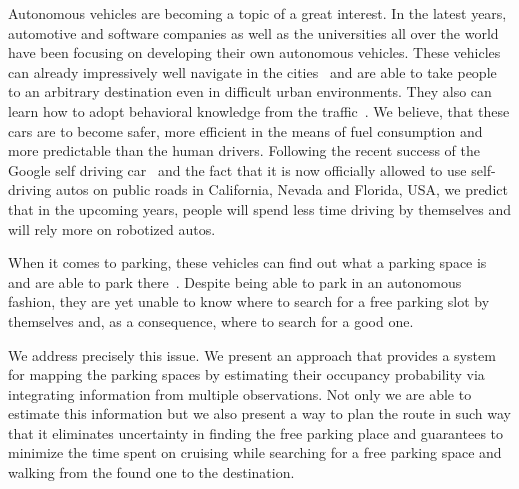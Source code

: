 Autonomous vehicles are becoming a topic of a great interest. In the latest
years, automotive and software companies as well as the universities all over
the world have been focusing on developing their own autonomous vehicles.
These vehicles can already impressively well navigate in the
cities~\cite{stanley_auto_car,perceprion_drivec_car,lima13,daimler} and are
able to take people to an arbitrary destination even in difficult urban
environments. They also can learn how to adopt behavioral knowledge from the
traffic~\cite{behaviour_learning,spinello10:multiclass}. We believe, that
these cars are to become safer, more efficient in the means of fuel
consumption and more predictable than the human drivers. Following the recent
success of the Google self driving car~\cite{markoff2010google} and the fact
that it is now officially allowed to use self-driving autos on public roads in
California, Nevada and Florida, USA, we predict that in the upcoming years,
people will spend less time driving by themselves and will rely more on
robotized autos.

When it comes to parking, these vehicles can find out what a parking space is
and are able to park
there~\cite{auto_cars_burgard,auto_parking09,auto_park2_11}. Despite being
able to park in an autonomous fashion, they are yet unable to know where to
search for a free parking slot by themselves and, as a consequence, where to
search for a good one.

We address precisely this issue. We present an approach that provides a system
for mapping the parking spaces by estimating their occupancy probability via
integrating information from multiple observations. Not only we are able to
estimate this information but we also present a way to plan the route in such
way that it eliminates uncertainty in finding the free parking place and
guarantees to minimize the time spent on cruising while searching for a free
parking space and walking from the found one to the destination.

